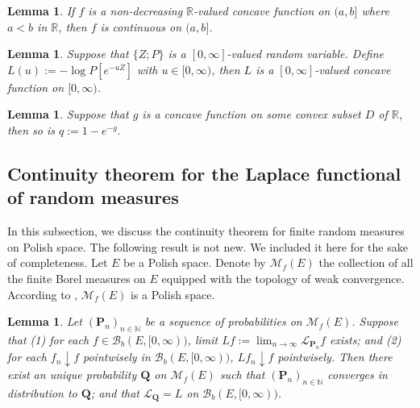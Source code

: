 \documentclass[12pt,a4paper]{amsart}
\numberwithin{equation}{section}
\theoremstyle{plain}
\newtheorem{lem}[thm]{Lemma}
\theoremstyle{definition}
\theoremstyle{remark}
\begin{document}
\begin{lem} \label{Fact:CR!}
	If $f$ is a non-decreasing $\mathbb R$-valued concave function on $(a,b]$ where $a<b$ in $\mathbb R$, then $f$ is continuous on $(a,b]$.
\end{lem}


\begin{lem} \label{Fact:CP!}
	Suppose that $\{Z; P\}$ is a $[0,\infty]$-valued random variable.
	Define $L(u):= - \log P[e^{- u Z}]$ with $u \in [0,\infty)$, then $L$ is a $[0,\infty]$-valued concave function on $[0,\infty)$.
\end{lem}

\begin{lem} \label{lem:CE}
	Suppose that $g$ is a concave function on some convex subset $D$ of $\mathbb R$, then so is $q:= 1- e^{-g}.$
\end{lem}

\subsection{Continuity theorem for the Laplace functional of random measures}
	In this subsection, we discuss the continuity theorem for finite random measures on Polish space.	
	The following result is not new. 
	We included it here for the sake of completeness.
	Let $E$ be a Polish space. 
	Denote by $\mathcal M_f(E)$ the collection of all the finite Borel measures on $E$ equipped with the topology of weak convergence.
	According to \cite[Lemma 4.5]{Kallenberg2017Random}, $\mathcal M_f(E)$ is a Polish space.
\begin{lem} \label{fact:WC}
	Let $(\mathbf P_n)_{n\in \mathbb N}$ be a sequence of probabilities on $\mathcal M_f(E)$.
	Suppose that 
	(1) for each $f \in \mathcal B_b(E,[0,\infty))$, limit $Lf := \lim_{n\to \infty}\mathscr L_{\mathbf P_n}f$ exists; and
	(2) for each $f_n \downarrow f$ pointwisely in $\mathcal B_b(E,[0,\infty))$, $Lf_n \downarrow f$ pointwisely.
	Then there exist an unique probability $\mathbf Q$ on $\mathcal M_f(E)$ such that $(\mathbf P_n)_{n \in \mathbb N}$ converges in distribution to $\mathbf Q$; and that $\mathscr L_\mathbf Q = L$ on $\mathcal B_b(E, [0,\infty))$.
\end{lem}
\end{document}
